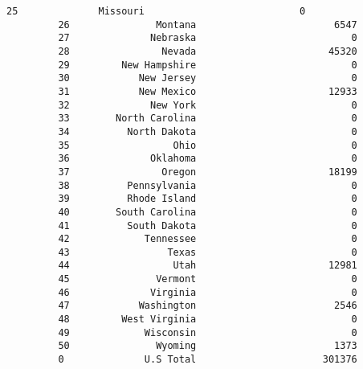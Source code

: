 \documentclass[11pt]{article}
\begin{document}
\begin{Verbatim}[commandchars=\\\{\}]
         25              Missouri                           0   
         26               Montana                        6547   
         27              Nebraska                           0   
         28                Nevada                       45320   
         29         New Hampshire                           0   
         30            New Jersey                           0   
         31            New Mexico                       12933   
         32              New York                           0   
         33        North Carolina                           0   
         34          North Dakota                           0   
         35                  Ohio                           0   
         36              Oklahoma                           0   
         37                Oregon                       18199   
         38          Pennsylvania                           0   
         39          Rhode Island                           0   
         40        South Carolina                           0   
         41          South Dakota                           0   
         42             Tennessee                           0   
         43                 Texas                           0   
         44                  Utah                       12981   
         45               Vermont                           0   
         46              Virginia                           0   
         47            Washington                        2546   
         48         West Virginia                           0   
         49             Wisconsin                           0   
         50               Wyoming                        1373   
         0              U.S Total                      301376   
         

\end{Verbatim}
\end{document}
